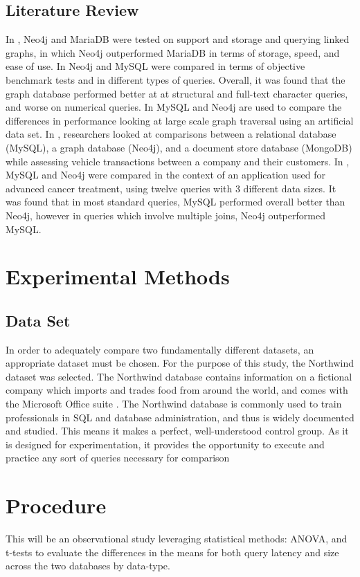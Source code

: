 \documentclass[conference]{IEEEtran}
\begin{document}
\subsection{Literature Review}
In \cite{kirby2014comparison}, Neo4j and MariaDB were tested on support and storage and querying linked graphs, in which Neo4j outperformed MariaDB in terms of storage, speed, and ease of use. In \cite{vicknair2010comparison} Neo4j and MySQL were compared in terms of objective benchmark tests and in different types of queries. Overall, it was found that the graph database performed better at at structural and full-text character queries, and worse on numerical queries. In \cite{marko2011comparison} MySQL and Neo4j are used to compare the differences in performance looking at large scale graph traversal using an artificial data set. In \cite{pandey2018comparison}, researchers looked at comparisons between a relational database (MySQL), a graph database (Neo4j), and a document store database (MongoDB) while assessing vehicle transactions between a company and their customers. In \cite{martinez2016comparison}, MySQL and Neo4j were compared in the context of an application used for advanced cancer treatment, using twelve queries with 3 different data sizes. It was found that in most standard queries, MySQL performed overall better than Neo4j, however in queries which involve multiple joins, Neo4j outperformed MySQL.    
\section{Experimental Methods}
\subsection{Data Set}

In order to adequately compare two fundamentally different datasets, an appropriate dataset must be chosen. For the purpose of this study, the Northwind \cite{microsoft} dataset was selected. The Northwind database contains information on a fictional company which imports and trades food from around the world, and comes with the Microsoft Office suite \cite{nwindDef}.
The Northwind database is commonly used to train professionals in SQL and database administration, and thus is widely documented and studied. This means it makes a perfect, well-understood control group. As it is designed for experimentation, it provides the opportunity to execute and practice any sort of queries necessary for comparison 

\section{Procedure}
    This will be an observational study leveraging statistical methods: ANOVA, and t-tests to evaluate the differences in the means for both query latency and size across the two databases by data-type.
\end{document}

